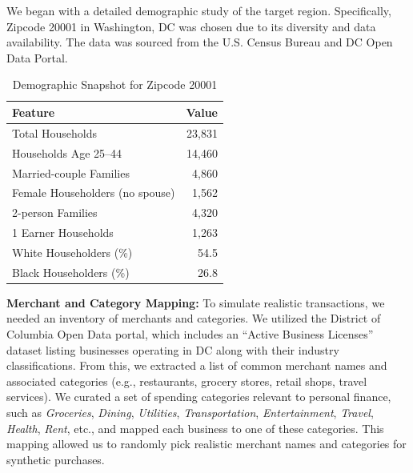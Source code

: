 \documentclass{scrartcl}
\begin{document}
We began with a detailed demographic study of the target region. Specifically, Zipcode 20001 in Washington, DC was chosen due to its diversity and data availability. The data was sourced from the U.S. Census Bureau and DC Open Data Portal.

\begin{table}[ht]
\centering
\caption{Demographic Snapshot for Zipcode 20001}
\label{tab:demographics_zipcode}
\begin{tabular}{|l|r|}
\hline
\textbf{Feature} & \textbf{Value} \\
\hline
Total Households & 23,831 \\
Households Age 25--44 & 14,460 \\
Married-couple Families & 4,860 \\
Female Householders (no spouse) & 1,562 \\
2-person Families & 4,320 \\
1 Earner Households & 1,263 \\
White Householders (\%) & 54.5 \\
Black Householders (\%) & 26.8 \\
\hline
\end{tabular}
\end{table}

\textbf{Merchant and Category Mapping:} To simulate realistic transactions, we needed an inventory of merchants and categories. We utilized the District of Columbia Open Data portal, which includes an “Active Business Licenses” dataset listing businesses operating in DC along with their industry classifications. From this, we extracted a list of common merchant names and associated categories (e.g., restaurants, grocery stores, retail shops, travel services). We curated a set of spending categories relevant to personal finance, such as \textit{Groceries}, \textit{Dining}, \textit{Utilities}, \textit{Transportation}, \textit{Entertainment}, \textit{Travel}, \textit{Health}, \textit{Rent}, etc., and mapped each business to one of these categories. This mapping allowed us to randomly pick realistic merchant names and categories for synthetic purchases.
\end{document}
